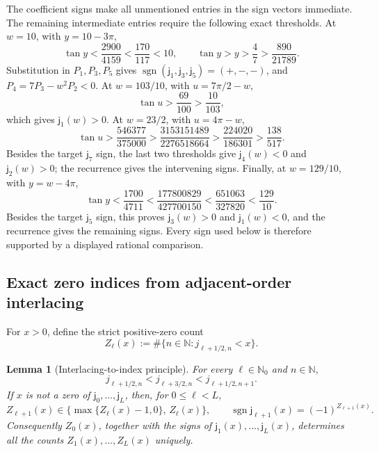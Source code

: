 \documentclass[11pt]{article}
\newcommand{\sgn}{\operatorname{sgn}}
\newtheorem{lemma}{Lemma}[section]
\begin{document}
The coefficient signs make all unmentioned entries in the sign vectors
immediate.  The remaining intermediate entries require the following exact
thresholds.  At \(w=10\), with \(y=10-3\pi\),
\[
 \tan y<\frac{2900}{4159}<\frac{170}{117}<10,
 \qquad
 \tan y>y>\frac47>\frac{890}{21789}.
\]
Substitution in \(P_1,P_3,P_5\) gives
\(\sgn(\mathsf j_1,\mathsf j_3,\mathsf j_5)=(+,-,-)\), and
\(P_4=7P_3-w^2P_2<0\).  At \(w=103/10\), with
\(u=7\pi/2-w\),
\[
 \tan u>\frac{69}{100}>\frac{10}{103},
\]
which gives \(\mathsf j_1(w)>0\).  At \(w=23/2\), with \(u=4\pi-w\),
\[
 \tan u>\frac{546377}{375000}>
 \frac{3153151489}{2276518664}>
 \frac{224020}{186301}>\frac{138}{517}.
\]
Besides the target \(\mathsf j_7\) sign, the last two thresholds give
\(\mathsf j_4(w)<0\) and \(\mathsf j_2(w)>0\); the recurrence gives the
intervening signs.  Finally, at \(w=129/10\), with \(y=w-4\pi\),
\[
 \tan y<\frac{1700}{4711}<
 \frac{177800829}{427700150}<
 \frac{651063}{327820}<\frac{129}{10}.
\]
Besides the target \(\mathsf j_5\) sign, this proves
\(\mathsf j_3(w)>0\) and \(\mathsf j_1(w)<0\), and the recurrence gives
the remaining signs.  Every sign used below is therefore supported by a
displayed rational comparison.

\subsection{Exact zero indices from adjacent-order interlacing}

For \(x>0\), define the strict positive-zero count
\[
 Z_\ell(x):=\#\{n\in\mathbb N:j_{\ell+1/2,n}<x\}.
\]

\begin{lemma}[Interlacing-to-index principle]
\label{lem:zero-index}
For every \(\ell\in\mathbb N_0\) and \(n\in\mathbb N\),
\begin{equation}
 j_{\ell+1/2,n}<j_{\ell+3/2,n}<j_{\ell+1/2,n+1}.
 \label{eq:adjacent-interlacing}
\end{equation}
If \(x\) is not a zero of
\(\mathsf j_0,\ldots,\mathsf j_L\), then, for \(0\leq\ell<L\),
\begin{equation}
 Z_{\ell+1}(x)\in
 \bigl\{\max\{Z_\ell(x)-1,0\},\,Z_\ell(x)\bigr\},
 \qquad
 \sgn\mathsf j_{\ell+1}(x)=(-1)^{Z_{\ell+1}(x)}.
 \label{eq:index-recursion}
\end{equation}
Consequently \(Z_0(x)\), together with the signs of
\(\mathsf j_1(x),\ldots,\mathsf j_L(x)\), determines all the counts
\(Z_1(x),\ldots,Z_L(x)\) uniquely.
\end{lemma}
\end{document}
